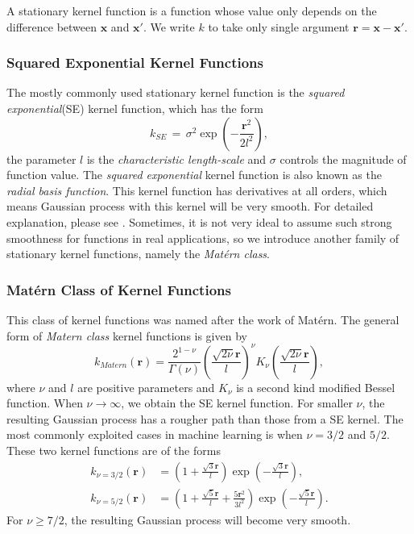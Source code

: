 \documentclass[11pt,a4paper]{article}
\theoremstyle{definition}
\numberwithin{equation}{section}
\let\vec\mathbf
\begin{document}
A stationary kernel function is a function whose value only depends on the difference between $\vec x$ and $\vec x'$. We write $k$ to take only single argument $\vec r = \vec x - \vec x'$. 
\subsubsection*{Squared Exponential Kernel Functions}
The mostly commonly used stationary kernel function is the \textit{squared exponential}(SE) kernel function, which has the form
\begin{equation}\label{SE_kernel}
k_{SE}\, = \, \sigma^2\exp\left(-\frac{\vec r^2}{2l^2}\right),
\end{equation}
the parameter $l$ is the \textit{characteristic length-scale} and $\sigma$ controls the magnitude of function value. The \textit{squared exponential} kernel function is also known as the \textit{radial basis function}. This kernel function has derivatives at all orders, which means Gaussian process with this kernel will be very smooth. For detailed explanation, please see \cite[Rasmussen and Williams, sec 4.2]{RandW}. Sometimes, it is not very ideal to assume such strong smoothness for functions in real applications, so we introduce another family of stationary kernel functions, namely the \textit{Mat\'ern class}\cite[Stein]{Stein}.

\subsubsection*{Mat\'ern Class of Kernel Functions}
This class of kernel functions was named after the work of Mat\'ern. The general form of \textit{Matern class} kernel functions is given by
\begin{equation}
k_{Matern}(\vec r) = \frac{2^{1-\nu}}{\Gamma{(\nu)}}\left(\frac{\sqrt{2\nu}\vec r}{l}\right)^\nu K_\nu \left(\frac{\sqrt{2\nu}\vec r}{l}\right),
\end{equation}
where $\nu$ and $l$ are positive parameters and $K_\nu$ is a second kind modified Bessel function\cite[Abramowitz and Stegun]{Ab_St}. When $\nu \rightarrow \infty$, we obtain the SE kernel function. For smaller $\nu$, the resulting Gaussian process has a rougher path than those from a SE kernel. The most commonly exploited cases in machine learning is when $\nu = 3/2$ and $ 5/2$\cite[Rasmussen and Williams, sec 4.2]{RandW}. These two kernel functions are of the forms
\begin{equation}
\begin{split}
k_{\nu = 3/2}(\vec r) &=\left(1+\frac{\sqrt{3}\vec r}{l}\right)\exp\left(-\frac{\sqrt{3}\vec r}{l}\right),\\
k_{\nu = 5/2}(\vec r) &=\left(1+\frac{\sqrt{5}\vec r}{l}+\frac{5\vec r^2}{3l^2}\right)\exp\left(-\frac{\sqrt{5}\vec r}{l}\right).
\end{split}
\end{equation}
For $\nu\geq 7/2$, the resulting Gaussian process will become very smooth\cite[Rasmussen and Williams, sec 4.2]{RandW}.
\end{document}
